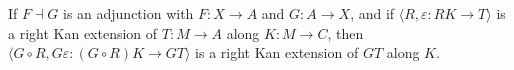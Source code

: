 If $F \dashv G$ is an adjunction with $F: X \to A$ and $G: A \to X$, and if $\langle R, \varepsilon: RK \to T \rangle$ is a right Kan extension of $T: M \to A$ along $K: M \to C$, then $\langle G \circ R, G\varepsilon: (G \circ R)K \to GT \rangle$ is a right Kan extension of $GT$ along $K$.
